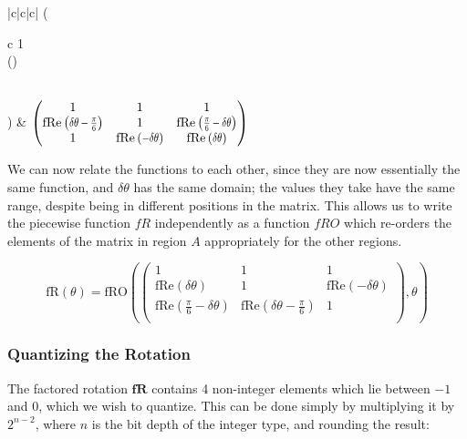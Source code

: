 \begin{tabular}{|c|c|c|}
\left(\!\!\!
\begin{array}{c}
 1 \\
 \cos (\theta ) \\
 \um{} \\
\end{array}
\!\!\!\right)\)   & \( \left(\!\!\!
\begin{array}{ccc}
 1 & 1 & 1 \\
 \fReq{\delta \theta -\frac{\pi }{6}} & 1 & \fReq{\frac{\pi }{6}-\delta \theta } \\
 1 & \fReq{-\delta \theta } & \fReq{\delta \theta } \\
\end{array}
\!\!\!\right)  \)  \\ 
\hline 
\end{tabular} 

\newcommand{\fRO}[1]{\text{fRO}\left( #1,\theta\right)}
We can now relate the functions to each other, since they are now essentially the same function, and $\delta\theta$ has the same domain; the values they take have the same range, despite being in different positions in the matrix. This allows us to write the piecewise function $fR$ independently as a function $fRO$ which re-orders the elements of the matrix in region $A$ appropriately for the other regions.

\begin{equation}
\text{fR}(\theta) = \fRO{\left(
\begin{array}{ccc}
 1 & 1 & 1 \\
 \text{fRe} (\delta \theta)  & 1 & \text{fRe} (-\delta \theta ) \\
 \text{fRe} \left(\frac{\pi }{6}-\delta \theta \right) & \text{fRe} \left(\delta \theta -\frac{\pi }{6}\right) & 1 \\
\end{array}
\right) }
\end{equation}



\subsubsection{Quantizing the Rotation}

The factored rotation $\mathbf{fR}$ contains 4 non-integer elements which lie between $-1$ and $0$, which we wish to quantize. This can be done simply by multiplying it by $2^{n - 2}$, where $n$ is the bit depth of the integer type, and rounding the result: 

